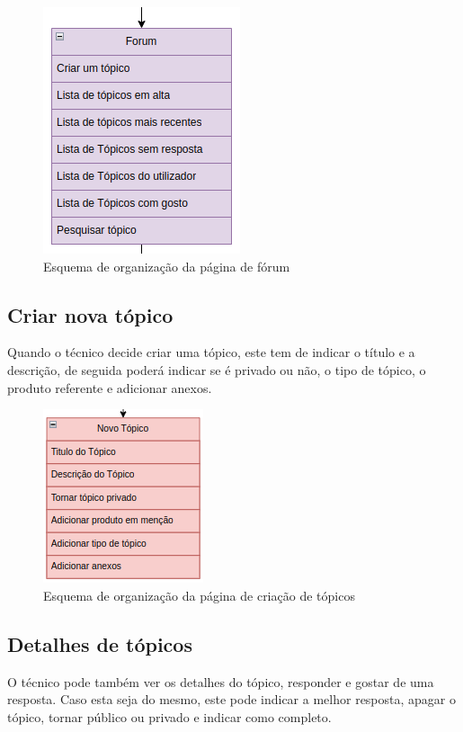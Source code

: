 \begin{figure}[htb]
  \centering
  
  \includegraphics[height=0.4\textwidth]{images/Arquiteturas/superficial_de_app/forum.png}
  \caption{Esquema de organização da página de fórum}
  \label{fig:5}
\end{figure}

\subsection{Criar nova tópico}

Quando o técnico decide criar uma tópico, este tem de indicar o título e a descrição, de seguida poderá indicar se é privado ou não, o tipo de tópico, o produto referente e adicionar anexos.

\begin{figure}[htb]
  \centering
  
  \includegraphics[height=0.3\textwidth]{images/Arquiteturas/superficial_de_app/criar_topico.png}
  \caption{Esquema de organização da página de criação de tópicos}
  \label{fig:6}
\end{figure}

\newpage

\subsection{Detalhes de tópicos}

O técnico pode também ver os detalhes do tópico, responder e gostar de uma resposta.
Caso esta seja do mesmo, este pode indicar a melhor resposta, apagar o tópico, tornar público ou privado e indicar como completo.

